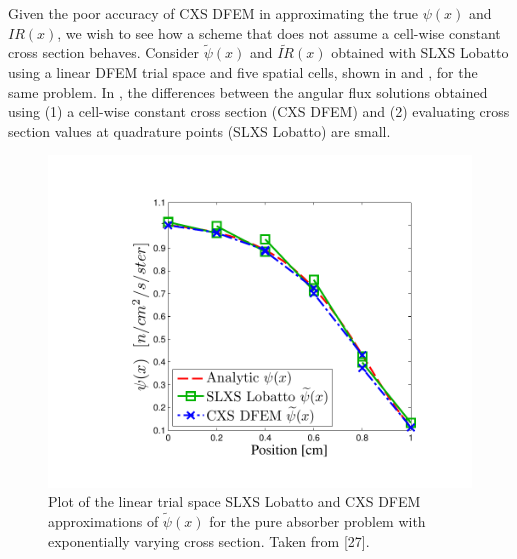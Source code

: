 \newpage
%
Given the poor accuracy of CXS DFEM in approximating the true $\psi(x)$ and $IR(x)$, we wish to see how a scheme that does not assume a cell-wise constant cross section behaves.
Consider $\widetilde{\psi}(x)$ and $\widetilde{IR}(x)$ obtained with SLXS Lobatto using a linear DFEM trial space and five spatial cells, shown in  and , for the same problem.  
In , the differences between the angular flux solutions obtained using (1) a cell-wise constant cross section (CXS DFEM) and (2) evaluating cross section values at quadrature points (SLXS Lobatto) are small.
\begin{figure}[!htp]
\centering
\includegraphics[width=12cm,trim=0.75in  0.4in 0.75in 0.6in,clip=true]{chapter3_variable_xs/SLXS_Psi_Profile.pdf}
\caption{Plot of the linear trial space SLXS Lobatto and CXS DFEM approximations of $\widetilde{\psi}(x)$ for the pure absorber problem with exponentially varying cross section.  Taken from [27].}
\label{fig:lobatto_blades_psi}
\end{figure}

